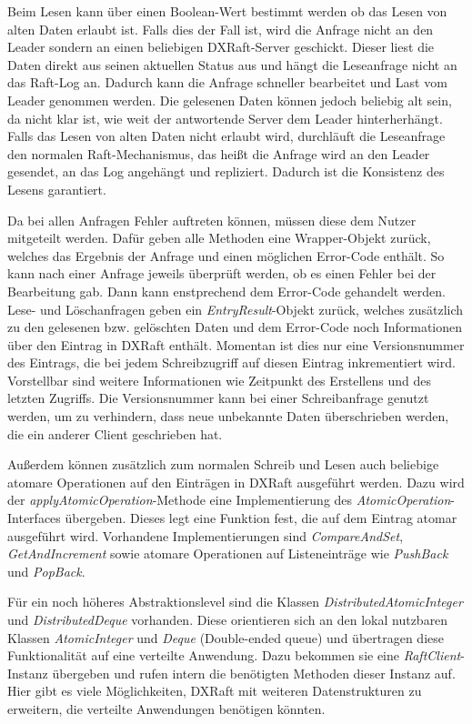 Beim Lesen kann über einen Boolean-Wert bestimmt werden ob das Lesen von alten Daten erlaubt ist. Falls dies der Fall ist, wird die Anfrage nicht an den Leader sondern an einen beliebigen DXRaft-Server geschickt. Dieser liest die Daten direkt aus seinen aktuellen Status aus und hängt die Leseanfrage nicht an das Raft-Log an. Dadurch kann die Anfrage schneller bearbeitet und Last vom Leader genommen werden. Die gelesenen Daten können jedoch beliebig alt sein, da nicht klar ist, wie weit der antwortende Server dem Leader hinterherhängt. Falls das Lesen von alten Daten nicht erlaubt wird, durchläuft die Leseanfrage den normalen Raft-Mechanismus, das heißt die Anfrage wird an den Leader gesendet, an das Log angehängt und repliziert. Dadurch ist die Konsistenz des Lesens garantiert.

Da bei allen Anfragen Fehler auftreten können, müssen diese dem Nutzer mitgeteilt werden. Dafür geben alle Methoden eine Wrapper-Objekt zurück, welches das Ergebnis der Anfrage und einen möglichen Error-Code enthält. So kann nach einer Anfrage jeweils überprüft werden, ob es einen Fehler bei der Bearbeitung gab. Dann kann enstprechend dem Error-Code gehandelt werden. Lese- und Löschanfragen geben ein \textit{EntryResult}-Objekt zurück, welches zusätzlich zu den gelesenen bzw. gelöschten Daten und dem Error-Code noch Informationen über den Eintrag in DXRaft enthält. Momentan ist dies nur eine Versionsnummer des Eintrags, die bei jedem Schreibzugriff auf diesen Eintrag inkrementiert wird. Vorstellbar sind weitere Informationen wie Zeitpunkt des Erstellens und des letzten Zugriffs. Die Versionsnummer kann bei einer Schreibanfrage genutzt werden, um zu verhindern, dass neue unbekannte Daten überschrieben werden, die ein anderer Client geschrieben hat.

Außerdem können zusätzlich zum normalen Schreib und Lesen auch beliebige atomare Operationen auf den Einträgen in DXRaft ausgeführt werden. Dazu wird der \textit{applyAtomicOperation}-Methode eine Implementierung des \textit{AtomicOperation}-Interfaces übergeben. Dieses legt eine Funktion fest, die auf dem Eintrag atomar ausgeführt wird. Vorhandene Implementierungen sind \textit{CompareAndSet}, \textit{GetAndIncrement} sowie atomare Operationen auf Listeneinträge wie \textit{PushBack} und \textit{PopBack}.

Für ein noch höheres Abstraktionslevel sind die Klassen \textit{DistributedAtomicInteger} und \textit{DistributedDeque} vorhanden. Diese orientieren sich an den lokal nutzbaren Klassen \textit{AtomicInteger} und \textit{Deque} (Double-ended queue) und übertragen diese Funktionalität auf eine verteilte Anwendung. Dazu bekommen sie eine \textit{RaftClient}-Instanz übergeben und rufen intern die benötigten Methoden dieser Instanz auf. Hier gibt es viele Möglichkeiten, DXRaft mit weiteren Datenstrukturen zu erweitern, die verteilte Anwendungen benötigen könnten.

